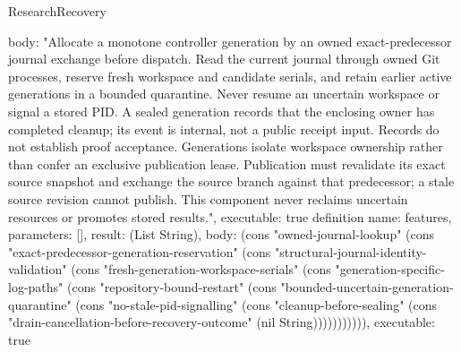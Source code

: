 \begin{lexlean}{ResearchRecovery}
\begin{semanticmodule}
{ body: "Allocate a monotone controller generation by an owned exact-predecessor journal exchange before dispatch. Read the current journal through owned Git processes, reserve fresh workspace and candidate serials, and retain earlier active generations in a bounded quarantine. Never resume an uncertain workspace or signal a stored PID. A sealed generation records that the enclosing owner has completed cleanup; its event is internal, not a public receipt input. Records do not establish proof acceptance. Generations isolate workspace ownership rather than confer an exclusive publication lease. Publication must revalidate its exact source snapshot and exchange the source branch against that predecessor; a stale source revision cannot publish. This component never reclaims uncertain resources or promotes stored results.",
 executable: true
}
definition{
 name: features,
 parameters: [],
 result: (List String),
 body: (cons "owned-journal-lookup" (cons "exact-predecessor-generation-reservation" (cons "structural-journal-identity-validation" (cons "fresh-generation-workspace-serials" (cons "generation-specific-log-paths" (cons "repository-bound-restart" (cons "bounded-uncertain-generation-quarantine" (cons "no-stale-pid-signalling" (cons "cleanup-before-sealing" (cons "drain-cancellation-before-recovery-outcome" (nil String))))))))))),
 executable: true
}
\end{semanticmodule}
\end{lexlean}
